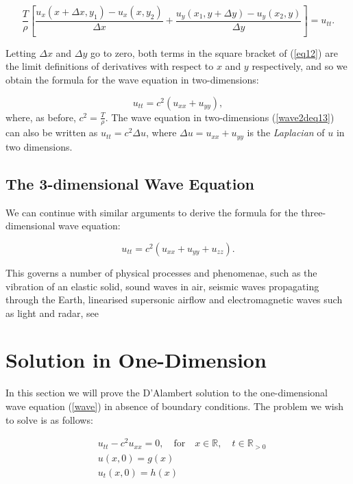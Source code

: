 \documentclass[a4paper, 12pt]{article}
\numberwithin{equation}{section}
\begin{document}
\begin{equation} \label{eq12}
    \frac{T}{\rho}\left[\frac{u_x(x+\Delta x, y_1)-u_x(x,y_2)}{\Delta x}+\frac{u_y(x_1,y+ \Delta y)-u_y(x_2,y)}{\Delta y}\right]=u_{tt}.
\end{equation}

Letting $\Delta x$ and $\Delta y$ go to zero, both terms in the square bracket of (\ref{eq12}) are the limit definitions of derivatives with
respect to $x$ and $y$ respectively, and so we obtain the formula for the wave equation in two-dimensions:

\begin{equation} \label{wave2deq13}
    u_{tt}=c^2(u_{xx}+u_{yy}),
\end{equation}
where, as before, $c^2=\frac{T}{\rho}$. The wave equation in two-dimensions (\ref{wave2deq13}) can also be written as $u_{tt}=c^2\Delta u$, 
where $\Delta u=u_{xx}+u_{yy}$ is the \emph{Laplacian} of $u$ in two dimensions.

\subsection{The 3-dimensional Wave Equation}
We can continue with similar arguments to derive the formula for the three-dimensional wave equation:

\begin {equation} \label{wave3deq14}
    u_{tt}=c^2(u_{xx}+u_{yy}+u_{zz}).
\end{equation}

This governs a number of physical processes and phenomenae, such as the vibration of an elastic solid, 
sound waves in air, seismic waves propagating through the Earth, linearised supersonic airflow and electromagnetic waves such as light and radar, see
\cite{Str}

\section{Solution in One-Dimension}
In this section we will prove the D'Alambert solution to the one-dimensional wave equation (\ref{wave}) 
in absence of boundary conditions. The problem we wish to solve is as follows:

\begin{equation} \label{ivp1d}
    \begin{aligned}
    &u_{tt}-c^2u_{xx}=0, \quad \textrm{for} \quad x\in \mathbb{R},\quad t\in \mathbb{R}_{>0}\\
    &u(x,0)=g(x)\\
    &u_t(x,0)=h(x)
    \end{aligned}
\end{equation}
\end{document}
